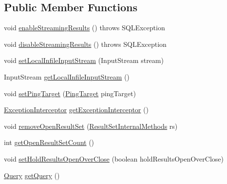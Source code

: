 \subsection*{Public Member Functions}
\begin{DoxyCompactItemize}
\item 
void \mbox{\hyperlink{interfacecom_1_1mysql_1_1cj_1_1jdbc_1_1_jdbc_statement_a35049f45e6278dc1b824812acbe75556}{enable\+Streaming\+Results}} ()  throws S\+Q\+L\+Exception
\item 
void \mbox{\hyperlink{interfacecom_1_1mysql_1_1cj_1_1jdbc_1_1_jdbc_statement_a11240571041f264e6bdde12ee05355a5}{disable\+Streaming\+Results}} ()  throws S\+Q\+L\+Exception
\item 
void \mbox{\hyperlink{interfacecom_1_1mysql_1_1cj_1_1jdbc_1_1_jdbc_statement_a89093285d02aa790bb07c7afab7c4140}{set\+Local\+Infile\+Input\+Stream}} (Input\+Stream stream)
\item 
Input\+Stream \mbox{\hyperlink{interfacecom_1_1mysql_1_1cj_1_1jdbc_1_1_jdbc_statement_a1f5ddb4f3f7ad5c677a27d5350568eac}{get\+Local\+Infile\+Input\+Stream}} ()
\item 
void \mbox{\hyperlink{interfacecom_1_1mysql_1_1cj_1_1jdbc_1_1_jdbc_statement_a7cf024a169c62cd9acbd867518a82dfc}{set\+Ping\+Target}} (\mbox{\hyperlink{interfacecom_1_1mysql_1_1cj_1_1_ping_target}{Ping\+Target}} ping\+Target)
\item 
\mbox{\hyperlink{interfacecom_1_1mysql_1_1cj_1_1exceptions_1_1_exception_interceptor}{Exception\+Interceptor}} \mbox{\hyperlink{interfacecom_1_1mysql_1_1cj_1_1jdbc_1_1_jdbc_statement_acaa2fa9b43fdb8d5020efed654034d53}{get\+Exception\+Interceptor}} ()
\item 
void \mbox{\hyperlink{interfacecom_1_1mysql_1_1cj_1_1jdbc_1_1_jdbc_statement_a5af1b0ade448d8559094223309113243}{remove\+Open\+Result\+Set}} (\mbox{\hyperlink{interfacecom_1_1mysql_1_1cj_1_1jdbc_1_1result_1_1_result_set_internal_methods}{Result\+Set\+Internal\+Methods}} rs)
\item 
int \mbox{\hyperlink{interfacecom_1_1mysql_1_1cj_1_1jdbc_1_1_jdbc_statement_ad7367340b87accdd66c01872ebaddbcd}{get\+Open\+Result\+Set\+Count}} ()
\item 
void \mbox{\hyperlink{interfacecom_1_1mysql_1_1cj_1_1jdbc_1_1_jdbc_statement_acf4340a52d236d444fa9584b3f9cc43b}{set\+Hold\+Results\+Open\+Over\+Close}} (boolean hold\+Results\+Open\+Over\+Close)
\item 
\mbox{\hyperlink{interfacecom_1_1mysql_1_1cj_1_1_query}{Query}} \mbox{\hyperlink{interfacecom_1_1mysql_1_1cj_1_1jdbc_1_1_jdbc_statement_a6ebd2f09956035be03e076980dce5528}{get\+Query}} ()
\end{DoxyCompactItemize}
